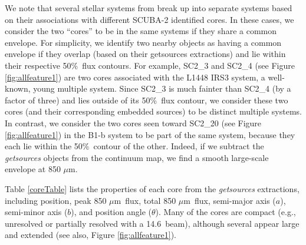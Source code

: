\documentclass[usenatbib,a4paper]{mnras}
\newcommand{\um}{\mbox{$\mu$m}}%
\begin{document}
We note that several stellar systems from \citet{Tobin16} break up into separate systems based on their associations with different SCUBA-2 identified cores.   In these cases, we consider the two ``cores'' to be in the same systems if they share a common envelope.  For simplicity, we identify two nearby objects as having a common envelope if they overlap (based on their getsources extractions) and lie within their respective 50\%\ flux contours.  For example, SC2\_3 and SC2\_4 (see Figure \ref{fig:allfeature1}) are two cores associated with the L1448 IRS3 system, a well-known, young multiple system.  Since SC2\_3 is much fainter than SC2\_4 (by a factor of three) and lies outside of its 50\%\ flux contour, we consider these two cores (and their corresponding embedded sources) to be distinct multiple systems.  In contrast, we consider the two cores seen toward SC2\_20 (see Figure \ref{fig:allfeature1}) in the B1-b system to be part of the same system, because they each lie within the 50\%\ contour of the other.  Indeed, if we subtract the \emph{getsources} objects from the continuum map, we find a smooth large-scale envelope at 850 \um.  

Table \ref{coreTable} lists the properties of each core from the \emph{getsources} extractions, including position, peak 850 \um\ flux, total 850 \um\ flux, semi-major axis ($a$), semi-minor axis ($b$), and position angle ($\theta$).  Many of the cores are compact (e.g., unresolved or partially resolved with a 14.6\arcsec\ beam), although several appear large and extended (see also, Figure \ref{fig:allfeature1}).  
\end{document}
